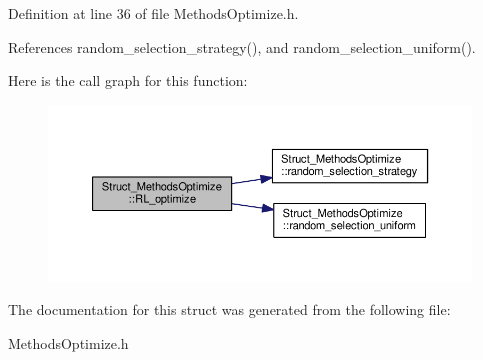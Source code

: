Definition at line 36 of file Methods\-Optimize.\-h.



References random\-\_\-selection\-\_\-strategy(), and random\-\_\-selection\-\_\-uniform().



Here is the call graph for this function\-:\nopagebreak
\begin{figure}[H]
\begin{center}
\leavevmode
\includegraphics[width=350pt]{structStruct__MethodsOptimize_aae92e8b55e02d8f476c70fd84a817b2d_cgraph}
\end{center}
\end{figure}




The documentation for this struct was generated from the following file\-:\begin{DoxyCompactItemize}
\item 
Methods\-Optimize.\-h\end{DoxyCompactItemize}

